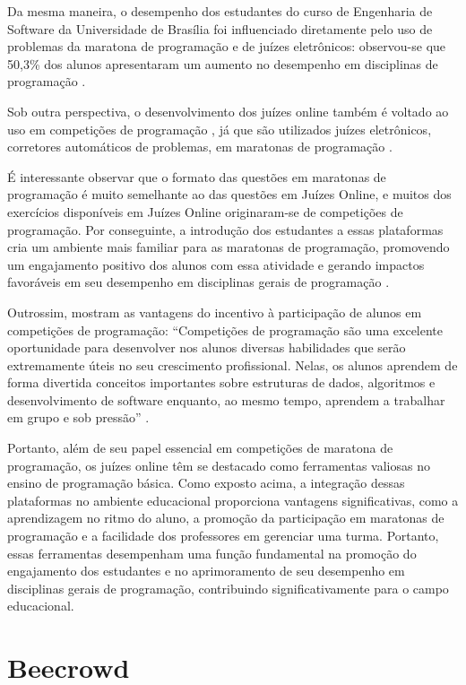 Da mesma maneira, o desempenho dos estudantes do curso de Engenharia de Software da Universidade de Brasília foi influenciado diretamente pelo uso de problemas da maratona de programação e de juízes eletrônicos: observou-se que 50,3\% dos alunos apresentaram um aumento no desempenho em disciplinas de programação \cite[p.~218]{salescosta}.

Sob outra perspectiva, o desenvolvimento dos juízes online também é voltado ao uso em competições de programação \cite[p.~964-965]{santosribeiro}, já que são utilizados juízes eletrônicos, corretores automáticos de problemas, em maratonas de programação \cite[p.~34]{lima2023}. 

É interessante observar que o formato das questões em maratonas de programação é muito semelhante ao das questões em Juízes Online, e muitos dos exercícios disponíveis em Juízes Online originaram-se de competições de programação. Por conseguinte, a introdução dos estudantes a essas plataformas cria um ambiente mais familiar para as maratonas de programação, promovendo um engajamento positivo dos alunos com essa atividade e gerando impactos favoráveis em seu desempenho em disciplinas gerais de programação \cite[p.~33-34]{lima2023}.

Outrossim, \textcite[p.~2]{camposferreira} mostram as vantagens do incentivo à participação de alunos em competições de programação: “Competições de programação são uma excelente oportunidade para desenvolver nos alunos diversas habilidades que serão extremamente úteis no seu crescimento profissional. Nelas, os alunos aprendem de forma divertida conceitos importantes sobre estruturas de dados, algoritmos e desenvolvimento de software enquanto, ao mesmo tempo, aprendem a trabalhar em grupo e sob pressão” \cite[p.~2]{camposferreira}.

Portanto, além de seu papel essencial em competições de maratona de programação, os juízes online têm se destacado como ferramentas valiosas no ensino de programação básica. Como exposto acima, a integração dessas plataformas no ambiente educacional proporciona vantagens significativas, como a aprendizagem no ritmo do aluno, a promoção da participação em maratonas de programação e a facilidade dos professores em gerenciar uma turma. Portanto, essas ferramentas desempenham uma função fundamental na promoção do engajamento dos estudantes e no aprimoramento de seu desempenho em disciplinas gerais de programação, contribuindo significativamente para o campo educacional.


\section{Beecrowd}
\label{sec:beecrowd}

